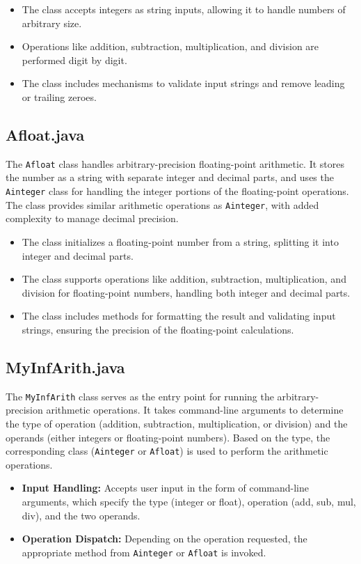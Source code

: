 \documentclass[12pt]{article}
\begin{document}
\begin{itemize}
    \item The class accepts integers as string inputs, allowing it to handle numbers of arbitrary size.
    \item Operations like addition, subtraction, multiplication, and division are performed digit by digit.
    \item The class includes mechanisms to validate input strings and remove leading or trailing zeroes.
\end{itemize}


\subsection{Afloat.java}
The \texttt{Afloat} class handles arbitrary-precision floating-point arithmetic. It stores the number as a string with separate integer and decimal parts, and uses the \texttt{Ainteger} class for handling the integer portions of the floating-point operations. The class provides similar arithmetic operations as \texttt{Ainteger}, with added complexity to manage decimal precision.

\begin{itemize}
    \item The class initializes a floating-point number from a string, splitting it into integer and decimal parts.
    \item The class supports operations like addition, subtraction, multiplication, and division for floating-point numbers, handling both integer and decimal parts.
    \item The class includes methods for formatting the result and validating input strings, ensuring the precision of the floating-point calculations.
\end{itemize}

\subsection{MyInfArith.java}
The \texttt{MyInfArith} class serves as the entry point for running the arbitrary-precision arithmetic operations. It takes command-line arguments to determine the type of operation (addition, subtraction, multiplication, or division) and the operands (either integers or floating-point numbers). Based on the type, the corresponding class (\texttt{Ainteger} or \texttt{Afloat}) is used to perform the arithmetic operations.

\begin{itemize}
    \item \textbf{Input Handling:} Accepts user input in the form of command-line arguments, which specify the type (integer or float), operation (add, sub, mul, div), and the two operands.
    \item \textbf{Operation Dispatch:} Depending on the operation requested, the appropriate method from \texttt{Ainteger} or \texttt{Afloat} is invoked.
\end{itemize}
\end{document}
